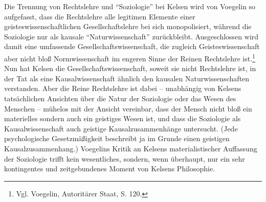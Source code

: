 \documentclass[12pt,a4paper,ngerman]{article}
\begin{document}
Die Trennung von Rechtslehre und "`Soziologie"' bei Kelsen wird von Voegelin
so aufgefasst, dass die Rechtslehre alle legitimen Elemente einer
geisteswissenschaftlichen Gesellschaftslehre bei sich monopolisiert, während
die Soziologie nur als kausale "`Naturwissenschaft"' zurückbleibt.
Ausgeschlossen wird damit eine umfassende Gesellschaftswissenschaft, die
zugleich Geisteswissenschaft aber nicht bloß Normwissenschaft im engeren Sinne
der Reinen Rechtslehre ist.\footnote{Vgl. Voegelin, Autoritärer Staat, S.
  120.}  Nun hat Kelsen die Gesellschaftswissenschaft, soweit sie nicht
Rechtslehre ist, in der Tat als eine Kausalwissenschaft ähnlich den kausalen
Naturwissenschaften verstanden. Aber die Reine Rechtslehre ist dabei --
unabhängig von Kelsens tatsächlichen Ansichten über die Natur der Soziologie
oder das Wesen des Menschen -- mühelos mit der Ansicht vereinbar, dass der
Mensch nicht bloß ein materielles sondern auch ein geistiges Wesen ist, und
dass die Soziologie als Kausalwissenschaft auch geistige Kausalzusammenhänge
untersucht. (Jede psychologische Gesetzmäßigkeit beschreibt ja im Grunde einen
geistigen Kausalzusammenhang.)
Voegelins Kritik an Kelsens materialistischer Auffassung der Soziologie trifft
kein wesentliches, sondern, wenn überhaupt, nur ein sehr kontingentes und
zeitgebundenes Moment von Kelsens Philosophie.
\end{document}
